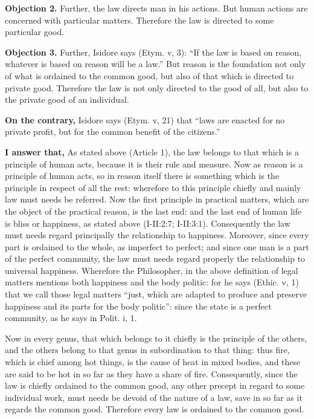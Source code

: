 \textbf{Objection 2.} Further, the law directs man in his actions. But human actions are concerned with particular matters. Therefore the law is directed to some particular good.

\textbf{Objection 3.} Further, Isidore says (Etym. v, 3): ``If the law is based on reason, whatever is based on reason will be a law.'' But reason is the foundation not only of what is ordained to the common good, but also of that which is directed to private good. Therefore the law is not only directed to the good of all, but also to the private good of an individual.

\textbf{On the contrary,} Isidore says (Etym. v, 21) that ``laws are enacted for no private profit, but for the common benefit of the citizens.''

\textbf{I answer that,} As stated above (Article 1), the law belongs to that which is a principle of human acts, because it is their rule and measure. Now as reason is a principle of human acts, so in reason itself there is something which is the principle in respect of all the rest: wherefore to this principle chiefly and mainly law must needs be referred. Now the first principle in practical matters, which are the object of the practical reason, is the last end: and the last end of human life is bliss or happiness, as stated above (I-II:2:7; I-II:3:1). Consequently the law must needs regard principally the relationship to happiness. Moreover, since every part is ordained to the whole, as imperfect to perfect; and since one man is a part of the perfect community, the law must needs regard properly the relationship to universal happiness. Wherefore the Philosopher, in the above definition of legal matters mentions both happiness and the body politic: for he says (Ethic. v, 1) that we call those legal matters ``just, which are adapted to produce and preserve happiness and its parts for the body politic'': since the state is a perfect community, as he says in Polit. i, 1.

Now in every genus, that which belongs to it chiefly is the principle of the others, and the others belong to that genus in subordination to that thing: thus fire, which is chief among hot things, is the cause of heat in mixed bodies, and these are said to be hot in so far as they have a share of fire. Consequently, since the law is chiefly ordained to the common good, any other precept in regard to some individual work, must needs be devoid of the nature of a law, save in so far as it regards the common good. Therefore every law is ordained to the common good.

